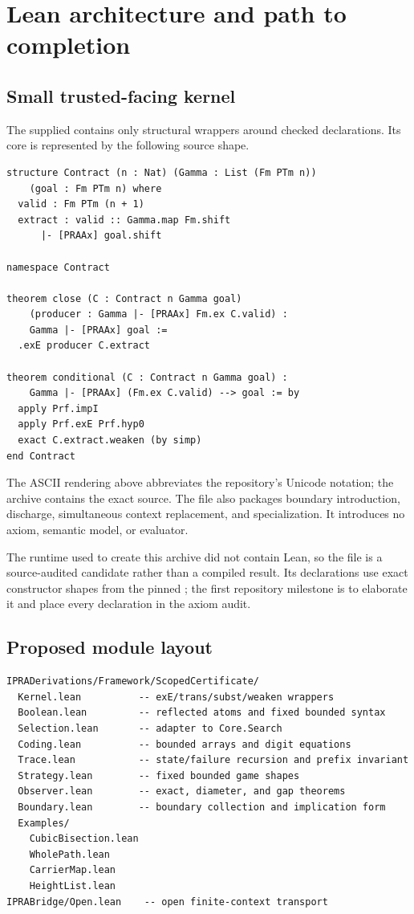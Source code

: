 \section{Lean architecture and path to completion}
\label{sec:lean}

\subsection{Small trusted-facing kernel}

The supplied  contains only structural
wrappers around checked declarations.  Its core is represented by the
following source shape.

\begin{lstlisting}[language=Lean]
structure Contract (n : Nat) (Gamma : List (Fm PTm n))
    (goal : Fm PTm n) where
  valid : Fm PTm (n + 1)
  extract : valid :: Gamma.map Fm.shift
      |- [PRAAx] goal.shift

namespace Contract

theorem close (C : Contract n Gamma goal)
    (producer : Gamma |- [PRAAx] Fm.ex C.valid) :
    Gamma |- [PRAAx] goal :=
  .exE producer C.extract

theorem conditional (C : Contract n Gamma goal) :
    Gamma |- [PRAAx] (Fm.ex C.valid) --> goal := by
  apply Prf.impI
  apply Prf.exE Prf.hyp0
  exact C.extract.weaken (by simp)
end Contract
\end{lstlisting}

The ASCII rendering above abbreviates the repository's Unicode notation; the
archive contains the exact source.  The file also packages boundary
introduction, discharge, simultaneous context replacement, and specialization.
It introduces no axiom, semantic model, or evaluator.

The runtime used to create this archive did not contain Lean, so the file is a
source-audited candidate rather than a compiled result.  Its declarations use
exact constructor shapes from the pinned ; the first
repository milestone is to elaborate it and place every declaration in the
axiom audit.

\subsection{Proposed module layout}

\begin{verbatim}
IPRADerivations/Framework/ScopedCertificate/
  Kernel.lean          -- exE/trans/subst/weaken wrappers
  Boolean.lean         -- reflected atoms and fixed bounded syntax
  Selection.lean       -- adapter to Core.Search
  Coding.lean          -- bounded arrays and digit equations
  Trace.lean           -- state/failure recursion and prefix invariant
  Strategy.lean        -- fixed bounded game shapes
  Observer.lean        -- exact, diameter, and gap theorems
  Boundary.lean        -- boundary collection and implication form
  Examples/
    CubicBisection.lean
    WholePath.lean
    CarrierMap.lean
    HeightList.lean
IPRABridge/Open.lean    -- open finite-context transport
\end{verbatim}

